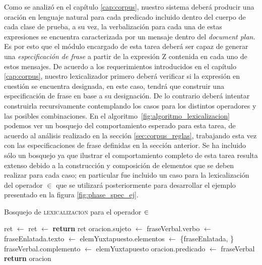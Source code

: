 Como se analizó en el capítulo \ref{cap:corpus}, nuestro sistema deberá producir una oración en lenguaje natural para cada predicado incluido dentro del cuerpo de cada clase de prueba, a su vez, la verbalización para cada una de estas expresiones se encuentra caracterizada por un mensaje dentro del \textit{document plan}. Es por esto que el módulo encargado de esta tarea deberá ser capaz de generar una \emph{especificación de frase} a partir de la expresión Z contenida en cada uno de estos mensajes. De acuerdo a los requerimientos introducidos en el capítulo \ref{cap:corpus}, nuestro lexicalizador primero deberá verificar si la expresión en cuestión se encuentra designada, en este caso, tendrá que construir una especificación de frase en base a su designación. De lo contrario deberá intentar construirla recursivamente contemplando los casos para los distintos operadores y las posibles combinaciones. En el algoritmo~\ref{fig:algoritmo_lexicalizacion} podemos ver un bosquejo del comportamiento esperado para esta tarea, de acuerdo al análisis realizado en la sección \ref{sec:corpus_reglas}, trabajando esta vez con las especificaciones de frase definidas en la sección anterior. Se ha incluido sólo un bosquejo ya que ilustrar el comportamiento completo de esta tarea resulta extenso debido a la construcción y composición de elementos que se deben realizar para cada caso; en particular fue incluido un caso para la lexicalización del operador $\in$ que se utilizará posteriormente para desarrollar el ejemplo presentado en la figura \ref{fig:phase_spec_ej}.

\begin{algorithm}[H]
\caption{Bosquejo de \textsc{lexicalizacion} para el operador $\protect\in$}
\label{fig:algoritmo_lexicalizacion}
\begin{algorithmic}[1]
\State ret $\gets$ 
\Else
\State ret $\gets$ 
\EndIf
\State \textbf{return} ret
\EndFunction
\Statex
{}
\State oracion.sujeto $\gets$ 
\State fraseVerbal.verbo $\gets$ 
\State fraseEnlatada.texto $\gets$ 
\State elemYuxtapuesto.elementos $\gets$ \{fraseEnlatada, \}
\State fraseVerbal.complemento $\gets$ elemYuxtapuesto
\State oracion.predicado $\gets$ fraseVerbal
\State \textbf{return} oracion
\EndFunction
\end{algorithmic}
\end{algorithm}

